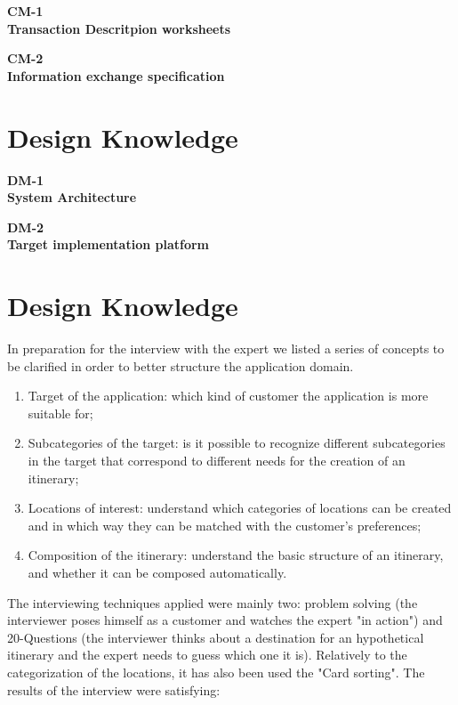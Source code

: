 \documentclass[11pt]{article} %
\def\worksheet#1#2{%
  \clearpage
  
  \begin{center}
  {\large\bf #1} \\
  {\normalsize\bf #2} \\[12pt]
  \begin{footnotesize}
  
  \end{footnotesize}
  \end{center}  
  \vfill}
\renewcommand\appendix{\par
  \setcounter{section}{0}
  \setcounter{subsection}{0}
  \setcounter{figure}{0}
  \setcounter{table}{0}
  \renewcommand\thesection{Appendix \Alph{section}}
  \renewcommand\thefigure{\Alph{section}\arabic{figure}}
  \renewcommand\thetable{\Alph{section}\arabic{table}}
}
\begin{document}
\worksheet{CM-1}{Transaction Descritpion worksheets}

\worksheet{CM-2}{Information exchange specification}

\clearpage
\section{Design Knowledge}

\worksheet{DM-1}{System Architecture}

\worksheet{DM-2}{Target implementation platform}

\appendix
\section{Design Knowledge}

In preparation for the interview with the expert we listed a series of concepts to be clarified in order to better structure the application domain. 

\begin{enumerate}
  \item Target of the application: which kind of customer the application is more suitable for;
  \item Subcategories of the target: is it possible to recognize different subcategories in the target that correspond to different needs for the creation of an itinerary;
  \item Locations of interest: understand which categories of locations can be created and in which way they can be matched with the customer's preferences;
  \item Composition of the itinerary: understand the basic structure of an itinerary, and whether it can be composed automatically.
\end{enumerate}

The interviewing techniques applied were mainly two: problem solving (the interviewer poses himself as a customer and watches the expert "in action") and 20-Questions (the interviewer thinks about a destination for an hypothetical itinerary and the expert needs to guess which one it is). Relatively to the categorization of the locations, it has also been used the "Card sorting".
The results of the interview were satisfying:
\end{document}

